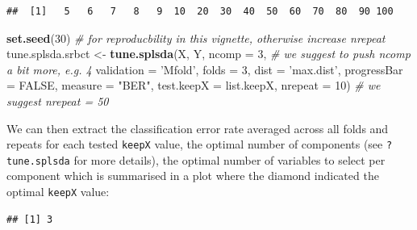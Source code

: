 \documentclass[]{book}
\newenvironment{Shaded}{\begin{snugshade}}{\end{snugshade}}
\newcommand{\KeywordTok}[1]{\textcolor[rgb]{0.13,0.29,0.53}{\textbf{#1}}}
\newcommand{\DataTypeTok}[1]{\textcolor[rgb]{0.13,0.29,0.53}{#1}}
\newcommand{\DecValTok}[1]{\textcolor[rgb]{0.00,0.00,0.81}{#1}}
\newcommand{\StringTok}[1]{\textcolor[rgb]{0.31,0.60,0.02}{#1}}
\newcommand{\CommentTok}[1]{\textcolor[rgb]{0.56,0.35,0.01}{\textit{#1}}}
\newcommand{\OtherTok}[1]{\textcolor[rgb]{0.56,0.35,0.01}{#1}}
\newcommand{\OperatorTok}[1]{\textcolor[rgb]{0.81,0.36,0.00}{\textbf{#1}}}
\newcommand{\NormalTok}[1]{#1}
\theoremstyle{definition}
\theoremstyle{definition}
\theoremstyle{definition}
\theoremstyle{remark}
\begin{document}
\begin{verbatim}
##  [1]   5   6   7   8   9  10  20  30  40  50  60  70  80  90 100
\end{verbatim}

\begin{Shaded}
\begin{Highlighting}[]
\KeywordTok{set.seed}\NormalTok{(}\DecValTok{30}\NormalTok{) }\CommentTok{# for reproducbility in this vignette, otherwise increase nrepeat}
\NormalTok{tune.splsda.srbct <-}\StringTok{ }\KeywordTok{tune.splsda}\NormalTok{(X, Y, }\DataTypeTok{ncomp =} \DecValTok{3}\NormalTok{, }\CommentTok{# we suggest to push ncomp a bit more, e.g. 4}
                                 \DataTypeTok{validation =} \StringTok{'Mfold'}\NormalTok{,}
                                 \DataTypeTok{folds =} \DecValTok{3}\NormalTok{, }\DataTypeTok{dist =} \StringTok{'max.dist'}\NormalTok{, }\DataTypeTok{progressBar =} \OtherTok{FALSE}\NormalTok{,}
                                 \DataTypeTok{measure =} \StringTok{"BER"}\NormalTok{, }\DataTypeTok{test.keepX =}\NormalTok{ list.keepX,}
                                 \DataTypeTok{nrepeat =} \DecValTok{10}\NormalTok{)   }\CommentTok{# we suggest nrepeat = 50}
\end{Highlighting}
\end{Shaded}

We can then extract the classification error rate averaged across all
folds and repeats for each tested \texttt{keepX} value, the optimal
number of components (see \texttt{?tune.splsda} for more details), the
optimal number of variables to select per component which is summarised
in a plot where the diamond indicated the optimal \texttt{keepX} value:

\begin{Shaded}
\end{Shaded}

\begin{verbatim}
## [1] 3
\end{verbatim}

\begin{Shaded}
\end{Shaded}
\end{document}
